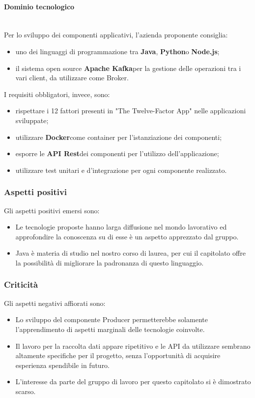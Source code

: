 \paragraph{Dominio tecnologico}\mbox{}\\
Per lo sviluppo dei componenti applicativi, l'azienda proponente consiglia:
\begin{itemize}
	\item uno dei linguaggi di programmazione tra \textbf{Java}\glo,
	\textbf{Python}\glosp o \textbf{Node.js}\glo;
	\item il sistema open source \textbf{Apache Kafka}\glosp per la gestione delle
	operazioni tra i vari client, da utilizzare come Broker.
\end{itemize}
I requisiti obbligatori, invece, sono:
\begin{itemize}
	\item rispettare i 12 fattori presenti in "The Twelve-Factor App" nelle 
	applicazioni sviluppate;
	\item utilizzare \textbf{Docker}\glosp come container per l'istanziazione dei componenti;
	\item esporre le \textbf{API Rest}\glosp dei componenti per l'utilizzo dell'applicazione; 
	\item utilizzare test unitari e d'integrazione per ogni componente 
	realizzato.
\end{itemize}
\subsubsection{Aspetti positivi}
Gli aspetti positivi emersi sono:
\begin{itemize}
	\item Le tecnologie proposte hanno larga diffusione nel mondo lavorativo ed
	 approfondire la conoscenza su di esse è un aspetto apprezzato dal gruppo.
	\item Java è materia di studio nel nostro corso di laurea, per cui il
	 capitolato offre la possibilità di migliorare la padronanza di questo
	 linguaggio.
\end{itemize}
\subsubsection{Criticità}
Gli aspetti negativi affiorati sono: 
\begin{itemize}
	\item Lo sviluppo del componente Producer permetterebbe solamente l'apprendimento di aspetti marginali delle tecnologie coinvolte.
	\item Il lavoro per la raccolta dati appare ripetitivo 
	 e le API da utilizzare sembrano altamente specifiche per il progetto, senza l'opportunità di acquisire esperienza spendibile in futuro.
	\item L'interesse da parte del gruppo di lavoro per questo capitolato si è 
dimostrato scarso.
	
\end{itemize}

